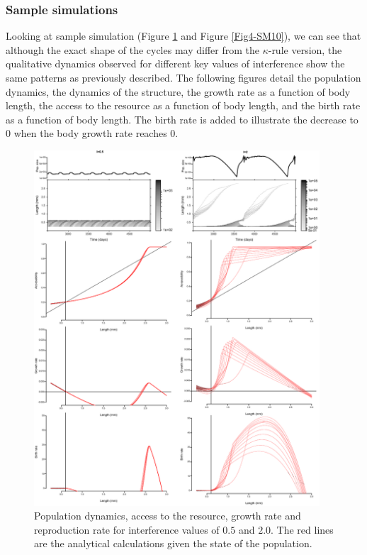 \subsubsection{Sample simulations}

Looking at sample simulation (Figure \ref{Fig4-SM9} and Figure \ref{Fig4-SM10}),
we can see that although the exact shape of the cycles may differ from the
$\kappa$-rule version, the qualitative dynamics observed for different key
values of interference show the same patterns as previously described. The following figures detail the
population dynamics, the dynamics of the structure, the growth rate as a
function of body length, the access to the resource as a function of body
length, and the birth rate as a function of body length. The birth rate is added
to illustrate the decrease to $0$ when the body growth rate reaches $0$.

\begin{figure}[!h] %
\centering
\includegraphics[width=0.95\textwidth]{4_ChapThe1/Fig/FigSM9}
\caption[Sample simulation for I=0.5
and I=2.0 (net production model)]{Population dynamics, access to the resource,
growth rate and reproduction rate for interference values of $0.5$ and $2.0$. The red lines are the analytical calculations given the state of the population.}
\label{Fig4-SM9}
\end{figure}

